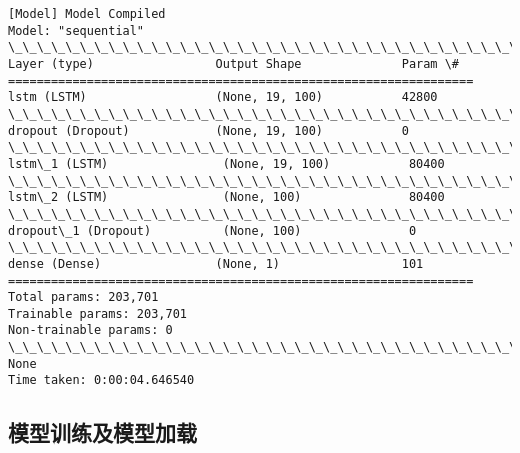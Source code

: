 \documentclass[11pt]{article}
\begin{document}
    \begin{Verbatim}[commandchars=\\\{\}]
[Model] Model Compiled
Model: "sequential"
\_\_\_\_\_\_\_\_\_\_\_\_\_\_\_\_\_\_\_\_\_\_\_\_\_\_\_\_\_\_\_\_\_\_\_\_\_\_\_\_\_\_\_\_\_\_\_\_\_\_\_\_\_\_\_\_\_\_\_\_\_\_\_\_\_
Layer (type)                 Output Shape              Param \#   
=================================================================
lstm (LSTM)                  (None, 19, 100)           42800     
\_\_\_\_\_\_\_\_\_\_\_\_\_\_\_\_\_\_\_\_\_\_\_\_\_\_\_\_\_\_\_\_\_\_\_\_\_\_\_\_\_\_\_\_\_\_\_\_\_\_\_\_\_\_\_\_\_\_\_\_\_\_\_\_\_
dropout (Dropout)            (None, 19, 100)           0         
\_\_\_\_\_\_\_\_\_\_\_\_\_\_\_\_\_\_\_\_\_\_\_\_\_\_\_\_\_\_\_\_\_\_\_\_\_\_\_\_\_\_\_\_\_\_\_\_\_\_\_\_\_\_\_\_\_\_\_\_\_\_\_\_\_
lstm\_1 (LSTM)                (None, 19, 100)           80400     
\_\_\_\_\_\_\_\_\_\_\_\_\_\_\_\_\_\_\_\_\_\_\_\_\_\_\_\_\_\_\_\_\_\_\_\_\_\_\_\_\_\_\_\_\_\_\_\_\_\_\_\_\_\_\_\_\_\_\_\_\_\_\_\_\_
lstm\_2 (LSTM)                (None, 100)               80400     
\_\_\_\_\_\_\_\_\_\_\_\_\_\_\_\_\_\_\_\_\_\_\_\_\_\_\_\_\_\_\_\_\_\_\_\_\_\_\_\_\_\_\_\_\_\_\_\_\_\_\_\_\_\_\_\_\_\_\_\_\_\_\_\_\_
dropout\_1 (Dropout)          (None, 100)               0         
\_\_\_\_\_\_\_\_\_\_\_\_\_\_\_\_\_\_\_\_\_\_\_\_\_\_\_\_\_\_\_\_\_\_\_\_\_\_\_\_\_\_\_\_\_\_\_\_\_\_\_\_\_\_\_\_\_\_\_\_\_\_\_\_\_
dense (Dense)                (None, 1)                 101       
=================================================================
Total params: 203,701
Trainable params: 203,701
Non-trainable params: 0
\_\_\_\_\_\_\_\_\_\_\_\_\_\_\_\_\_\_\_\_\_\_\_\_\_\_\_\_\_\_\_\_\_\_\_\_\_\_\_\_\_\_\_\_\_\_\_\_\_\_\_\_\_\_\_\_\_\_\_\_\_\_\_\_\_
None
Time taken: 0:00:04.646540

    \end{Verbatim}

    \subsection{模型训练及模型加载}\label{ux6a21ux578bux8badux7ec3ux53caux6a21ux578bux52a0ux8f7d}
\end{document}
